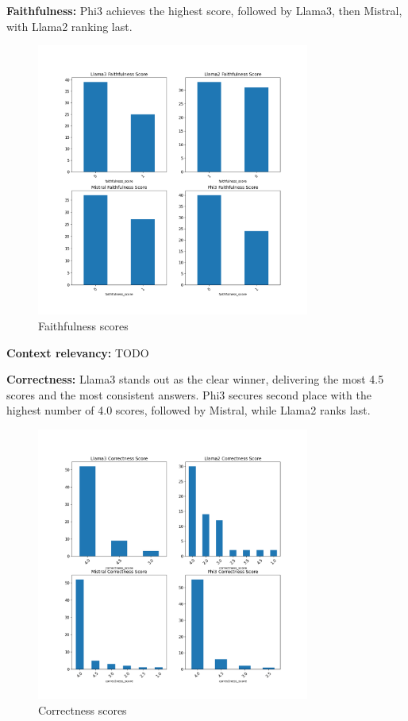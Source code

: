 \documentclass[]{article}
\begin{document}
\textbf{Faithfulness:}
Phi3 achieves the highest score, followed by Llama3, then Mistral, with Llama2 ranking last.
\begin{figure}[H]
    \centering
    \includegraphics[width=0.8\textwidth]{./images/faith_hm.png}
    \caption{Faithfulness scores}
    \label{fig:image_label}
\end{figure}

\textbf{Context relevancy:}
TODO

\textbf{Correctness:}
Llama3 stands out as the clear winner, delivering the most 4.5 scores and the most consistent answers.  
Phi3 secures second place with the highest number of 4.0 scores, followed by Mistral, while Llama2 ranks last.
\begin{figure}[H]
    \centering
    \includegraphics[width=0.8\textwidth]{./images/correct_hm.png}
    \caption{Correctness scores}
    \label{fig:image_label}
\end{figure}
\end{document}
